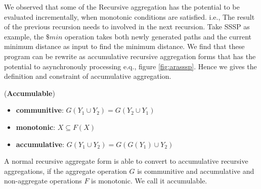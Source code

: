 {

	
We observed that some of the Recursive aggregation has the potential to be evaluated incrementally, when monotonic conditions are satisfied. i.e., The result of the previous recursion needs to involved in the next recursion. Take SSSP as example, the $\$min$ operation takes both newly generated paths and the current minimum distance as input to find the minimum distance. We find that these program can be rewrite as accumulative recursive aggregation forms that has the potential to asynchronouly processing e.q., figure \ref{fig:arasssp}. Hence we gives the definition and constraint of accumulative aggregation.


\begin{definition}
	\label{th:monotone}
	(\textbf{Accumulable}) 
	\begin{itemize}
		\item \textbf{communitive}: $G(Y_1\cup Y_2)=G(Y_2\cup Y_1)$
		\item \textbf{monotonic}: $X\subseteq F(X)$
		\item \textbf{accumulative}: $G(Y_1\cup Y_2)=G(G(Y_1)\cup Y_2)$
	\end{itemize}
	A normal recursive aggregate form is able to convert to accumulative recursive aggregations, if the aggregate operation $G$ is communitive and accumulative and non-aggregate operations $F$ is monotonic. We call it accumulable.
\end{definition}
	
}
